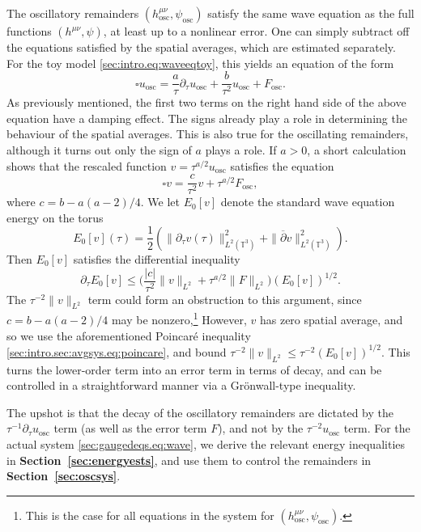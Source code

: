 \documentclass{article}
\newcommand{\TT}{\mathbb{T}}
\newcommand{\osc}{\mathrm{osc}}
\newcommand{\ol}{\overline}
\newcommand{\pa}{\partial}
\begin{document}
The oscillatory remainders $(h_{\osc}^{\mu\nu},\psi_{\osc})$ satisfy the same wave equation as the full functions $(h^{\mu\nu},\psi)$, at least up to a nonlinear error. One can simply subtract off the equations satisfied by the spatial averages, which are estimated separately. For the toy model \eqref{sec:intro.eq:waveeqtoy}, this yields an equation of the form
\begin{equation}
    \square u_\osc = \frac{a}{\tau}\pa_\tau u_\osc + \frac{b}{\tau^2}u_\osc + F_\osc.
\end{equation}
As previously mentioned, the first two terms on the right hand side of the above equation have a damping effect. The signs already play a role in determining the behaviour of the spatial averages. This is also true for the oscillating remainders, although it turns out only the sign of $a$ plays a role. If $a > 0$, a short calculation shows that the rescaled function $v = \tau^{a/2}u_\osc$ satisfies the equation
\begin{equation}\label{sec:intro.eq:oscexplain1}
    \square v = \frac{c}{\tau^2}v + \tau^{a/2}F_\osc,
\end{equation}
where $c = b-a(a-2)/4$. We let $E_0[v]$ denote the standard wave equation energy on the torus 
\begin{equation}
    E_0[v](\tau) = \frac{1}{2}(\|\pa_{\tau} v(\tau)\|_{L^2(\TT^3)}^2 + \|\ol{\pa} v\|_{L^2(\TT^3)}^2).
\end{equation}
Then $E_0[v]$ satisfies the differential inequality
\begin{equation}\label{sec:intro.eq:oscexplain2}
    \pa_\tau E_0[v] \leq \Big(\frac{|c|}{\tau^2}\|v\|_{L^2} + \tau^{a/2}\|F\|_{L^2}\Big)(E_0[v])^{1/2}.
\end{equation}
The $\tau^{-2}\|v\|_{L^2}$ term could form an obstruction to this argument, since $c = b-a(a-2)/4$ may be nonzero,\footnote{This is the case for all equations in the system for $(h_{\osc}^{\mu\nu},\psi_\osc)$.} However, $v$ has zero spatial average, and so we use the aforementioned Poincar\'e inequality \eqref{sec:intro.sec:avgsys.eq:poincare}, and bound $\tau^{-2}\|v\|_{L^2} \leq \tau^{-2}(E_0[v])^{1/2}$. This turns the lower-order term into an error term in terms of decay, and can be controlled in a straightforward manner via a Gr\"onwall-type inequality.
 
The upshot is that the decay of the oscillatory remainders are dictated by the $\tau^{-1}\pa_\tau u_{\osc}$ term (as well as the error term $F$), and not by the $\tau^{-2} u_{\osc}$ term. For the actual system \eqref{sec:gaugedeqs.eq:wave}, we derive the relevant energy inequalities in \textbf{Section~\ref{sec:energyests}}, and use them to control the remainders in \textbf{Section~\ref{sec:oscsys}}.
\end{document}
